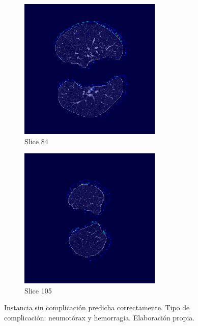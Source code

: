 \begin{figure}[!htbp]
\vspace{0.5cm}

\begin{subfigure}[b]{0.45\textwidth}
    \includegraphics[width=\textwidth]{img/label1_fallo_pred0_pid87MASSN_slice_84.png}
    \caption{Slice 84}
\end{subfigure}
\hfill
\begin{subfigure}[b]{0.45\textwidth}
    \includegraphics[width=\textwidth]{img/label1_fallo_pred0_pid87MASSN_slice_105.png}
    \caption{Slice 105}
\end{subfigure}

\caption{Instancia sin complicación predicha correctamente. Tipo de complicación: neumotórax y hemorragia. Elaboración propia. }
\label{fig:label1-incorrecta}
\end{figure}





